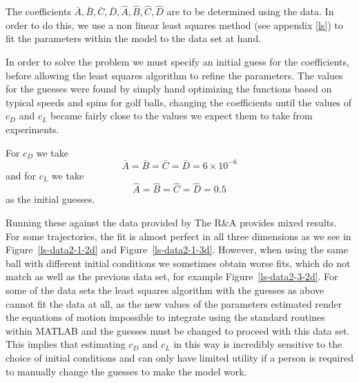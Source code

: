 The coefficients $\bar{A}, \bar{B}, \bar{C}, \bar{D}, \hat{A}, \hat{B}, \hat{C}, \hat{D}$ are to be
determined using the data. In order to do this, we use a non linear least squares method (see appendix 
\ref{ls}) to fit the parameters within the model to the data set at hand.

In order to solve the problem we must specify an initial guess for the coefficients, before allowing
the least squares algorithm to refine the parameters. The values for the guesses were found by 
simply hand optimizing the functions based on typical speeds and spins for golf balls, changing the
coefficients until the values of $c_D$ and $c_L$ became fairly close to the values we expect them to
take from experiments.

For $c_D$ we take
\[
\bar{A} = \bar{B} = \bar{C} = \bar{D} = 6 \times 10^{-6}
\]
and for $c_L$ we take
\[
\hat{A} = \hat{B} = \hat{C} = \hat{D} = 0.5
\]
as the initial guesses.

Running these against the data provided by The R\&A provides mixed results. For some trajectories, 
the fit is almost perfect in all three dimensions as we see in Figure~\ref{ls-data2-1-2d} and 
Figure~\ref{ls-data2-1-3d}. However,
when using the same ball with different initial conditions we sometimes obtain worse fits, which do not match
as well as the previous data set, for example Figure~\ref{ls-data2-3-2d}. For some of the data sets
the least squares algorithm with the guesses as above cannot fit the data at all, as the new values 
of the parameters estimated render the equations of motion impossible to integrate using the standard routines within
MATLAB and the guesses must be changed to proceed with this data set. This implies that estimating $c_D$
and $c_L$ in this way
is incredibly sensitive to the choice of initial conditions and can only have limited utility if
a person is required to manually change the guesses to make the model work.

